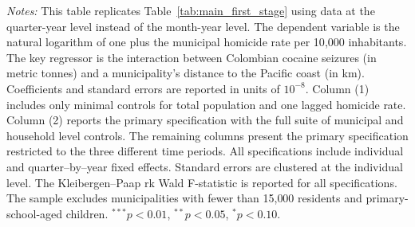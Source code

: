 \documentclass[12pt,letter,english,intoc,bibliography=totoc,index=totoc,BCOR10mm,captions=tableheading,nottitlepage,fleqn]{article}
\theoremstyle{break}
\begin{document}
\begin{table}[H]
\centering
\caption{Quarterly First Stage Estimates}
\label{tab:main_first_stage_quarterly}
\centering
\scriptsize

\vspace{2mm}
\begin{minipage}{0.95\linewidth}
\scriptsize \singlespacing
\textit{Notes:} This table replicates Table~\ref{tab:main_first_stage} using data at the quarter-year level instead of the month-year level. The dependent variable is the natural logarithm of one plus the municipal homicide rate per 10{,}000 inhabitants. The key regressor is the interaction between Colombian cocaine seizures (in metric tonnes) and a municipality's distance to the Pacific coast (in km). Coefficients and standard errors are reported in units of $10^{-8}$. Column (1) includes only minimal controls for total population and one lagged homicide rate. Column (2) reports the primary specification with the full suite of municipal and household level controls. The remaining columns present the primary specification restricted to the three different time periods. All specifications include individual and quarter--by--year fixed effects. Standard errors are clustered at the individual level. The Kleibergen--Paap rk Wald F-statistic is reported for all specifications. The sample excludes municipalities with fewer than 15{,}000 residents and primary-school-aged children. $^{***}p<0.01$, $^{**}p<0.05$, $^{*}p<0.10$.
\end{minipage}
\end{table}
\end{document}
